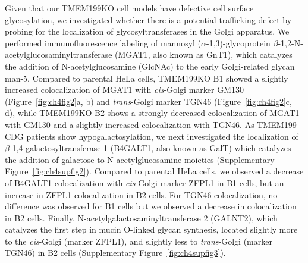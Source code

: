 Given that our TMEM199KO cell models have defective cell surface glycosylation, we investigated whether there is a potential trafficking defect by probing for the localization of glycosyltransferases in the Golgi apparatus. We performed immunofluorescence labeling of mannosyl ($\alpha$-1,3)-glycoprotein $\beta$-1,2-N-acetylglucosaminyltransferase (MGAT1, also known as GnT1), which catalyzes the addition of N-acetylglucosamine (GlcNAc) to the early Golgi-related glycan man-5. Compared to parental HeLa cells, TMEM199KO B1 showed a slightly increased colocalization of MGAT1 with \emph{cis}-Golgi marker GM130 (Figure~\ref{fig:ch4fig2}a, b) and \emph{trans}-Golgi marker TGN46 (Figure~\ref{fig:ch4fig2}c, d), while TMEM199KO B2 shows a strongly decreased colocalization of MGAT1 with GM130 and a slightly increased colocalization with TGN46. As TMEM199-CDG patients show hypogalactosylation, we next investigated the localization of $\beta$-1,4-galactosyltransferase 1 (B4GALT1, also known as GalT) which catalyzes the addition of galactose to N-acetylglucosamine moieties (Supplementary Figure~\ref{fig:ch4supfig2}). Compared to parental HeLa cells, we observed a decrease of B4GALT1 colocalization with \emph{cis}-Golgi marker ZFPL1\cite{chiu_zfpl1_2008} in B1 cells, but an increase in ZFPL1 colocalization in B2 cells. For TGN46 colocalization, no difference was observed for B1 cells but we observed a decrease in colocalization in B2 cells. Finally, N-acetylgalactosaminyltransferase 2 (GALNT2), which catalyzes the first step in mucin O-linked glycan synthesis, located slightly more to the \emph{cis}-Golgi (marker ZFPL1), and slightly less to \emph{trans}-Golgi (marker TGN46) in B2 cells (Supplementary Figure~\ref{fig:ch4supfig3}).

